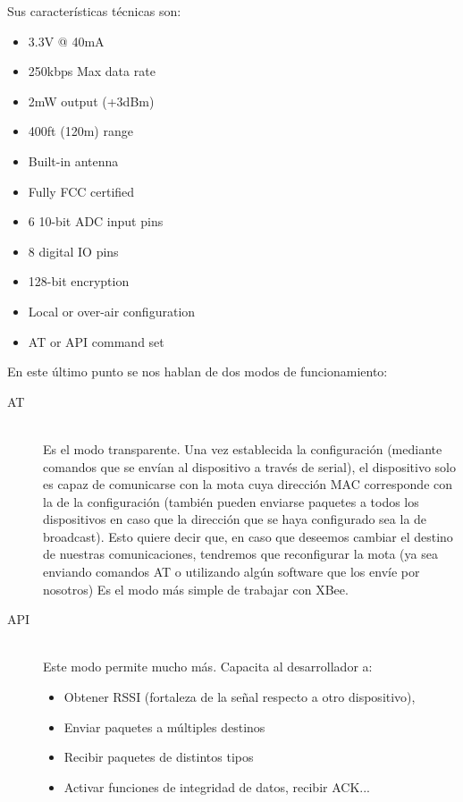 Sus características técnicas son:
\begin{itemize}
  \item 3.3V @ 40mA
  \item 250kbps Max data rate
  \item 2mW output (+3dBm)
  \item 400ft (120m) range
  \item Built-in antenna
  \item Fully FCC certified
  \item 6 10-bit ADC input pins
  \item 8 digital IO pins
  \item 128-bit encryption
  \item Local or over-air configuration
  \item AT or API command set
\end{itemize}

En este último punto se nos hablan de dos modos de funcionamiento:

\begin{description}
  \item[AT] \hfill \\
    Es el modo transparente. Una vez establecida la configuración (mediante comandos
    que se envían al dispositivo a través de serial), el dispositivo solo es capaz de
    comunicarse con la mota cuya dirección MAC corresponde con la de la configuración
    (también pueden enviarse paquetes a todos los dispositivos en caso que la dirección
    que se haya configurado sea la de broadcast). Esto quiere decir que, en caso que
    deseemos cambiar el destino de nuestras comunicaciones, tendremos que reconfigurar
    la mota (ya sea enviando comandos AT o utilizando algún software que los envíe
    por nosotros) Es el modo más simple de trabajar con XBee.
 \item[API] \hfill \\
    Este modo permite mucho más. Capacita al desarrollador a:
      \begin{itemize}
        \item Obtener RSSI (fortaleza de la señal respecto a otro dispositivo),
        \item Enviar paquetes a múltiples destinos
        \item Recibir paquetes de distintos tipos
        \item Activar funciones de integridad de datos, recibir ACK...
      \end{itemize}
\end{description}



